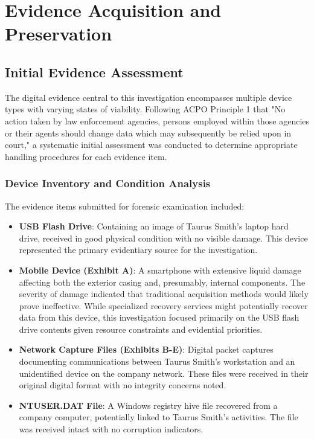 \chapter{Evidence Acquisition and Preservation}

\section{Initial Evidence Assessment}
The digital evidence central to this investigation encompasses multiple device types with varying states of viability. Following ACPO Principle 1 that "No action taken by law enforcement agencies, persons employed within those agencies or their agents should change data which may subsequently be relied upon in court," a systematic initial assessment was conducted to determine appropriate handling procedures for each evidence item.

\subsection{Device Inventory and Condition Analysis}
The evidence items submitted for forensic examination included:

\begin{itemize}
    \item \textbf{USB Flash Drive}: Containing an image of Taurus Smith's laptop hard drive, received in good physical condition with no visible damage. This device represented the primary evidentiary source for the investigation.
    
    \item \textbf{Mobile Device (Exhibit A)}: A smartphone with extensive liquid damage affecting both the exterior casing and, presumably, internal components. The severity of damage indicated that traditional acquisition methods would likely prove ineffective. While specialized recovery services might potentially recover data from this device, this investigation focused primarily on the USB flash drive contents given resource constraints and evidential priorities.
    
    \item \textbf{Network Capture Files (Exhibits B-E)}: Digital packet captures documenting communications between Taurus Smith's workstation and an unidentified device on the company network. These files were received in their original digital format with no integrity concerns noted.
    
    \item \textbf{NTUSER.DAT File}: A Windows registry hive file recovered from a company computer, potentially linked to Taurus Smith's activities. The file was received intact with no corruption indicators.
\end{itemize}

